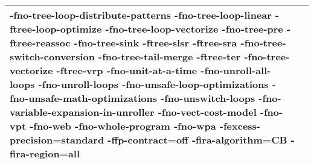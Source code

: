 \begin{tabular}{|l|p{6.2in}|}
-fno-tree-loop-distribute-patterns -fno-tree-loop-linear -ftree-loop-optimize -fno-tree-loop-vectorize -fno-tree-pre -ftree-reassoc -fno-tree-sink -ftree-slsr -ftree-sra -fno-tree-switch-conversion -fno-tree-tail-merge -ftree-ter -fno-tree-vectorize -ftree-vrp -fno-unit-at-a-time -fno-unroll-all-loops -fno-unroll-loops -fno-unsafe-loop-optimizations -fno-unsafe-math-optimizations -fno-unswitch-loops -fno-variable-expansion-in-unroller -fno-vect-cost-model -fno-vpt -fno-web -fno-whole-program -fno-wpa -fexcess-precision=standard -ffp-contract=off -fira-algorithm=CB -fira-region=all }\\
     \hline
    \end{tabular}    
